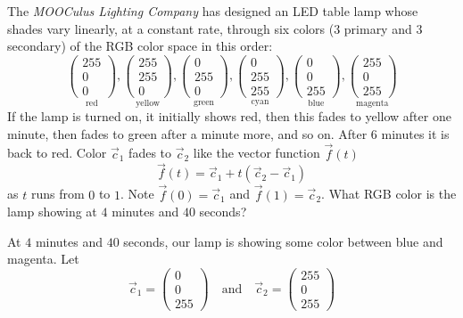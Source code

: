 \documentclass{ximera}
\begin{document}
\begin{example}
  The \textit{MOOCulus Lighting Company} has designed an LED table
  lamp whose shades vary linearly, at a constant rate, through six
  colors ($3$ primary and $3$ secondary) of the RGB color space in
  this order:
    \[
    \underset{\text{red}}{\begin{pmatrix}255\\0\\0\end{pmatrix}},
    \underset{\text{yellow}}{\begin{pmatrix}255\\255\\0\end{pmatrix}},
    \underset{\text{green}}{\begin{pmatrix}0\\255\\0\end{pmatrix}},
    \underset{\text{cyan}}{\begin{pmatrix}0\\255\\255\end{pmatrix}},
    \underset{\text{blue}}{\begin{pmatrix}0\\0\\255\end{pmatrix}},
    \underset{\text{magenta}}{\begin{pmatrix}255\\0\\255\end{pmatrix}}
    \]
  If the lamp is turned on, it initially shows red, then this fades to
  yellow after one minute, then fades to green after a minute more,
  and so on. After $6$ minutes it is back to red. Color $\vec{c}_1$
  fades to $\vec{c}_2$ like the vector function $\vec{f}(t)$
  \[
  \vec{f}(t) = \vec{c}_1+ t(\vec{c}_2 -\vec{c}_1)
  \]
  as $t$ runs from $0$ to $1$. Note $\vec{f}(0) = \vec{c}_1$ and
  $\vec{f}(1) = \vec{c}_2$.  What RGB color is the lamp showing at $4$
  minutes and $40$ seconds?
  \begin{explanation}
    At $4$ minutes and $40$ seconds, our lamp is showing some color
    between blue and magenta. Let
    \[
    \vec{c}_1 = \begin{pmatrix}0\\0\\255\end{pmatrix} \quad\text{and}\quad
      \vec{c}_2 = \begin{pmatrix}255\\0\\255\end{pmatrix}
\]
\end{explanation}
\end{example}
\end{document}
